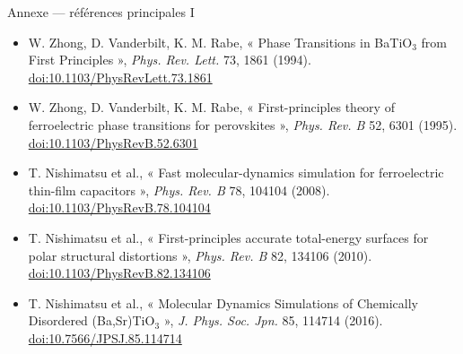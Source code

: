 \documentclass[aspectratio=169,10pt,t]{beamer}
\begin{document}
\begin{frame}{Annexe --- références principales I}
  \small
  \begin{itemize}\setlength\itemsep{0.28cm}
    \item W. Zhong, D. Vanderbilt, K. M. Rabe, « Phase Transitions in BaTiO$_3$ from First Principles », \textit{Phys. Rev. Lett.} 73, 1861 (1994). \href{https://doi.org/10.1103/PhysRevLett.73.1861}{doi:10.1103/PhysRevLett.73.1861}
    \item W. Zhong, D. Vanderbilt, K. M. Rabe, « First-principles theory of ferroelectric phase transitions for perovskites », \textit{Phys. Rev. B} 52, 6301 (1995). \href{https://doi.org/10.1103/PhysRevB.52.6301}{doi:10.1103/PhysRevB.52.6301}
    \item T. Nishimatsu et al., « Fast molecular-dynamics simulation for ferroelectric thin-film capacitors », \textit{Phys. Rev. B} 78, 104104 (2008). \href{https://doi.org/10.1103/PhysRevB.78.104104}{doi:10.1103/PhysRevB.78.104104}
    \item T. Nishimatsu et al., « First-principles accurate total-energy surfaces for polar structural distortions », \textit{Phys. Rev. B} 82, 134106 (2010). \href{https://doi.org/10.1103/PhysRevB.82.134106}{doi:10.1103/PhysRevB.82.134106}
    \item T. Nishimatsu et al., « Molecular Dynamics Simulations of Chemically Disordered (Ba,Sr)TiO$_3$ », \textit{J. Phys. Soc. Jpn.} 85, 114714 (2016). \href{https://doi.org/10.7566/JPSJ.85.114714}{doi:10.7566/JPSJ.85.114714}
  \end{itemize}
\end{frame}
\end{document}
